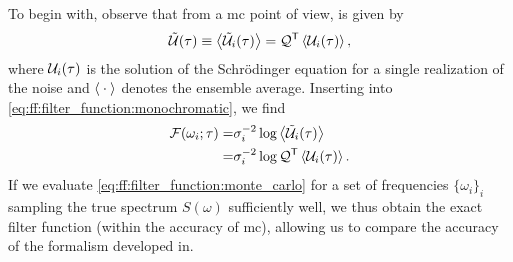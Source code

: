 To begin with, observe that from a \gls{mc} point of view, \liouvUe is given by
\begin{align}
    \liouvUe(\tau) \equiv \expval{\liouvUe_i(\tau)} = \liouvQ\transpose \expval{\liouvU_i(\tau)},
\end{align}
where $\mathcal{U}_i(\tau)$ is the solution of the Schrödinger equation for a single realization of the noise and $\expval{\:\cdot\:}$ denotes the ensemble average.
Inserting into \cref{eq:ff:filter_function:monochromatic}, we find
\begin{equation}
    \label{eq:ff:filter_function:monte_carlo}
    \begin{split}
        \mc{F}(\omega_i; \tau) =& \sigma_i^{-2}\log\expval{\liouvUe_i(\tau)} \\
                               =& \sigma_i^{-2}\log\liouvQ\transpose\expval{\liouvU_i(\tau)}.
    \end{split}
\end{equation}
If we evaluate \cref{eq:ff:filter_function:monte_carlo} for a set of frequencies $\lbrace\omega_i\rbrace_i$ sampling the true spectrum $S(\omega)$ sufficiently well, we thus obtain the exact filter function \FF (within the accuracy of \gls{mc}), allowing us to compare the accuracy of the formalism developed in.

